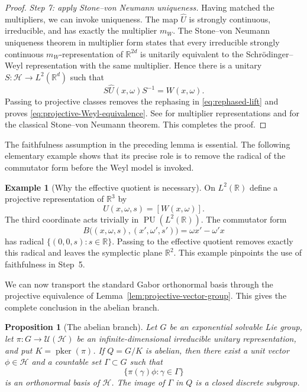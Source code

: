 \documentclass[reqno]{amsart}
\numberwithin{equation}{section}
\newtheorem{proposition}[theorem]{Proposition}
\theoremstyle{definition}
\newtheorem{example}[theorem]{Example}
\theoremstyle{remark}
\newcommand{\cH}{\mathcal H}
\newcommand{\R}{\mathbb R}
\newcommand{\U}{\mathcal U}
\newcommand{\PU}{\operatorname{PU}}
\newcommand{\pker}{\operatorname{pker}}
\newcommand{\Step}[1]{\par\medskip\noindent\textit{#1.}\quad}
\begin{document}
\begin{proof}
\Step{Step 7: apply Stone--von Neumann uniqueness}
Having matched the multipliers, we can invoke uniqueness.  The map
$\widehat U$ is strongly continuous, irreducible, and has exactly the
multiplier $m_W$.  The Stone--von Neumann uniqueness theorem in multiplier
form states that every irreducible strongly continuous $m_W$-representation
of $\R^{2d}$ is unitarily equivalent to the Schr\"odinger--Weyl
representation with the same multiplier.  Hence there is a unitary
$S:\cH\to L^2(\R^d)$ such that
\[
 S\widehat U(x,\omega)S^{-1}=W(x,\omega).
\]
Passing to projective classes removes the rephasing in
\eqref{eq:rephased-lift} and proves
\eqref{eq:projective-Weyl-equivalence}.  See
\cite[Theorem~3.3 and p.~314]{BaggettKleppner1973} for multiplier
representations and \cite[Theorem~1.50]{Folland1989} for the classical
Stone--von Neumann theorem.  This completes the proof.
\end{proof}

The faithfulness assumption in the preceding lemma is essential.  The
following elementary example shows that its precise role is to remove the
radical of the commutator form before the Weyl model is invoked.

\begin{example}[Why the effective quotient is necessary]
\label{ex:radical-before-quotient}
On $L^2(\R)$ define a projective representation of $\R^3$ by
\[
 U(x,\omega,s)=[W(x,\omega)].
\]
The third coordinate acts trivially in $\PU(L^2(\R))$.  The commutator form
\[
 B\bigl((x,\omega,s),(x',\omega',s')\bigr)
 =\omega x'-\omega'x
\]
has radical $\{(0,0,s):s\in\R\}$.  Passing to the effective quotient removes
exactly this radical and leaves the symplectic plane $\R^2$.  This example
pinpoints the use of faithfulness in Step~5.
\end{example}

We can now transport the standard Gabor orthonormal basis through the
projective equivalence of Lemma~\ref{lem:projective-vector-group}.  This
gives the complete conclusion in the abelian branch.

\begin{proposition}[The abelian branch]
\label{prop:abelian-quotient}
Let $G$ be an exponential solvable Lie group, let
$\pi:G\to\U(\cH)$ be an infinite-dimensional irreducible unitary
representation, and put $K=\pker(\pi)$.  If $Q=G/K$ is abelian, then there
exist a unit vector $\phi\in\cH$ and a countable set $\Gamma\subset G$ such
that
\[
 \{\pi(\gamma)\phi:\gamma\in\Gamma\}
\]
is an orthonormal basis of $\cH$.  The image of $\Gamma$ in $Q$ is a closed
discrete subgroup.
\end{proposition}
\end{document}
